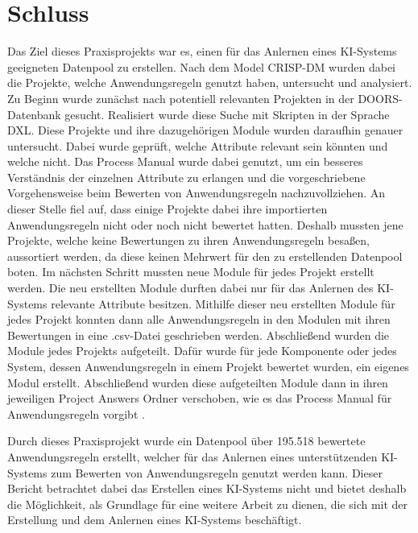 \chapter{Schluss}
\label{chap:Schluss}
Das Ziel dieses Praxisprojekts war es, einen für das Anlernen eines KI-Systems geeigneten Datenpool zu erstellen. Nach dem Model \acs{CRISP-DM} wurden dabei die Projekte, welche
Anwendungsregeln genutzt haben, untersucht und analysiert. Zu Beginn wurde zunächst nach potentiell relevanten Projekten in der \acs{DOORS}-Datenbank gesucht. Realisiert wurde diese Suche mit Skripten
in der Sprache \acs{DXL}.
Diese Projekte und ihre dazugehörigen Module wurden daraufhin genauer untersucht. Dabei wurde geprüft, welche Attribute relevant sein könnten und welche nicht. Das Process Manual wurde dabei genutzt,
um ein besseres Verständnis der einzelnen Attribute zu erlangen und die vorgeschriebene Vorgehensweise beim Bewerten von Anwendungsregeln nachzuvollziehen. An dieser Stelle fiel auf, dass einige
Projekte dabei ihre importierten Anwendungsregeln nicht oder noch nicht bewertet hatten. Deshalb mussten jene Projekte, welche keine Bewertungen zu ihren Anwendungsregeln besaßen, aussortiert werden,
da diese keinen Mehrwert für den zu erstellenden Datenpool boten. Im nächsten Schritt mussten neue Module für jedes Projekt erstellt werden. Die neu erstellten Module durften dabei nur für das Anlernen
des KI-Systems relevante Attribute besitzen. Mithilfe dieser neu erstellten Module für jedes Projekt konnten dann alle Anwendungsregeln in den Modulen mit ihren Bewertungen in eine .csv-Datei geschrieben 
werden. Abschließend wurden die Module jedes Projekts aufgeteilt. Dafür wurde für jede Komponente oder jedes System, dessen Anwendungsregeln in einem Projekt bewertet wurden, ein eigenes Modul erstellt. 
Abschließend wurden diese aufgeteilten Module dann in ihren jeweiligen Project Answers Ordner verschoben, wie es das Process Manual für Anwendungsregeln vorgibt \cite[S.32]{q2}. 

Durch dieses Praxisprojekt wurde ein Datenpool über 195.518 bewertete Anwendungsregeln erstellt, welcher für das Anlernen eines unterstützenden KI-Systems zum Bewerten von Anwendungsregeln genutzt werden
kann. Dieser Bericht betrachtet dabei das Erstellen eines KI-Systems nicht und bietet deshalb die Möglichkeit, als Grundlage für eine weitere Arbeit zu dienen, die sich mit der Erstellung und dem Anlernen
eines KI-Systems beschäftigt.
